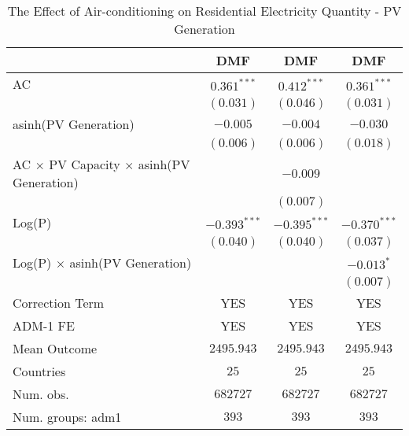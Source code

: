 
\begin{table}[htbp]
\caption{The Effect of Air-conditioning on Residential Electricity Quantity - PV Generation}
\begin{center}
\begin{tabular}{l c c c}
\hline
 & DMF & DMF & DMF \\
\hline
AC                                                    & $0.361^{***}$  & $0.412^{***}$  & $0.361^{***}$  \\
                                                      & $(0.031)$      & $(0.046)$      & $(0.031)$      \\
asinh(PV Generation)                                  & $-0.005$       & $-0.004$       & $-0.030$       \\
                                                      & $(0.006)$      & $(0.006)$      & $(0.018)$      \\
AC $\times$ PV Capacity $\times$ asinh(PV Generation) &                & $-0.009$       &                \\
                                                      &                & $(0.007)$      &                \\
Log(P)                                                & $-0.393^{***}$ & $-0.395^{***}$ & $-0.370^{***}$ \\
                                                      & $(0.040)$      & $(0.040)$      & $(0.037)$      \\
Log(P) $\times$ asinh(PV Generation)                  &                &                & $-0.013^{*}$   \\
                                                      &                &                & $(0.007)$      \\
\hline
Correction Term                                       & YES            & YES            & YES            \\
ADM-1 FE                                              & YES            & YES            & YES            \\
Mean Outcome                                          & $2495.943$     & $2495.943$     & $2495.943$     \\
Countries                                             & $25$           & $25$           & $25$           \\
Num. obs.                                             & $682727$       & $682727$       & $682727$       \\
Num. groups: adm1                                     & $393$          & $393$          & $393$          \\

\end{tabular}
\end{center}
\end{table}
